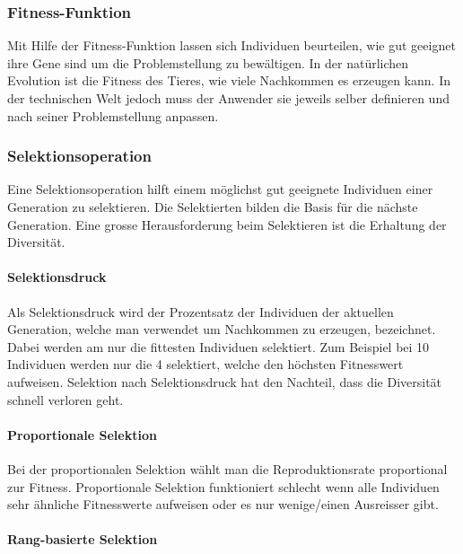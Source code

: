     \subsubsection{Fitness-Funktion}

      Mit Hilfe der Fitness-Funktion lassen sich Individuen beurteilen,
      wie gut geeignet ihre Gene sind um die Problemstellung zu bewältigen.
      In der natürlichen Evolution ist die Fitness des Tieres, wie viele Nachkommen es erzeugen kann.
      In der technischen Welt jedoch muss der Anwender sie jeweils selber definieren und
      nach seiner Problemstellung anpassen.

    \subsubsection{Selektionsoperation}

      Eine Selektionsoperation hilft einem möglichst gut geeignete Individuen einer Generation zu selektieren.
      Die Selektierten bilden die Basis für die nächste Generation.
      Eine grosse Herausforderung beim Selektieren ist die Erhaltung der Diversität.

      \paragraph{Selektionsdruck}

        Als Selektionsdruck wird der Prozentsatz der Individuen der aktuellen Generation,
        welche man verwendet um Nachkommen zu erzeugen, bezeichnet.
        Dabei werden am nur die fittesten Individuen selektiert.
        Zum Beispiel bei 10 Individuen werden nur die 4 selektiert, welche den höchsten Fitnesswert aufweisen.
        Selektion nach Selektionsdruck hat den Nachteil, dass die Diversität schnell verloren geht.

      \paragraph{Proportionale Selektion}

        Bei der proportionalen Selektion wählt man die Reproduktionsrate proportional zur Fitness.
        Proportionale Selektion funktioniert schlecht wenn alle Individuen sehr ähnliche Fitnesswerte aufweisen oder es nur wenige/einen Ausreisser gibt.

      \paragraph{Rang-basierte Selektion}

